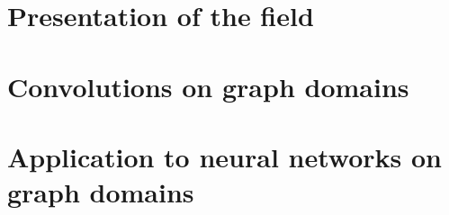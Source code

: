 \documentclass[12pt]{book}
\begin{document}

%
%


%
%

\dominitoc
\tableofcontents




  \chapter{Presentation of the field}
  \vfill\minitoc\newpage
  \newpage

  \newpage
  \newpage
  \newpage

%
%

\setcounter{chapter}{1}
\chapter{Convolutions on graph domains}
\newpage
\vfill\minitoc\newpage

\newpage
\newpage
\newpage
\newpage
\newpage

%
%
 \setcounter{chapter}{2}
 \chapter{Application to neural networks on graph domains}
 \vfill\minitoc\newpage
 \newpage


 \newpage

%
%

\end{document}
